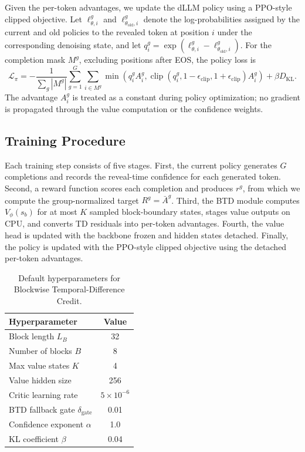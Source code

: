 \documentclass[letterpaper]{article}
\begin{document}
Given the per-token advantages, we update the dLLM policy using a PPO-style clipped objective. Let $\ell_{\theta,i}^g$ and $\ell_{\theta_{\mathrm{old}},i}^g$ denote the log-probabilities assigned by the current and old policies to the revealed token at position $i$ under the corresponding denoising state, and let $q_i^g=\exp(\ell_{\theta,i}^g-\ell_{\theta_{\mathrm{old}},i}^g)$. For the completion mask $M^g$, excluding positions after EOS, the policy loss is
\begin{equation}
\mathcal{L}_{\pi} =
-\frac{1}{\sum_g |M^g|}
\sum_{g=1}^{G}\sum_{i\in M^g}
\min\left(
q_i^g A_i^g,
\operatorname{clip}(q_i^g,1-\epsilon_{\mathrm{clip}},1+\epsilon_{\mathrm{clip}})A_i^g
\right)
+\beta D_{\mathrm{KL}}.
\end{equation}
The advantage $A_i^g$ is treated as a constant during policy optimization; no gradient is propagated through the value computation or the confidence weights.

\subsection{Training Procedure}

Each training step consists of five stages. First, the current policy generates $G$ completions and records the reveal-time confidence for each generated token. Second, a reward function scores each completion and produces $r^g$, from which we compute the group-normalized target $R^g=\bar{A}^g$. Third, the BTD module computes $V_\phi(s_b)$ for at most $K$ sampled block-boundary states, stages value outputs on CPU, and converts TD residuals into per-token advantages. Fourth, the value head is updated with the backbone frozen and hidden states detached. Finally, the policy is updated with the PPO-style clipped objective using the detached per-token advantages.

\begin{table}[t]
\centering
\small
\begin{tabular}{lc}
\hline
Hyperparameter & Value \\
\hline
Block length $L_B$ & 32 \\
Number of blocks $B$ & 8 \\
Max value states $K$ & 4 \\
Value hidden size & 256 \\
Critic learning rate & $5\times10^{-6}$ \\
BTD fallback gate $\delta_{\mathrm{gate}}$ & 0.01 \\
Confidence exponent $\alpha$ & 1.0 \\
KL coefficient $\beta$ & 0.04 \\
\hline
\end{tabular}
\caption{Default hyperparameters for Blockwise Temporal-Difference Credit.}
\label{tab:method_hparams}
\end{table}
\end{document}
